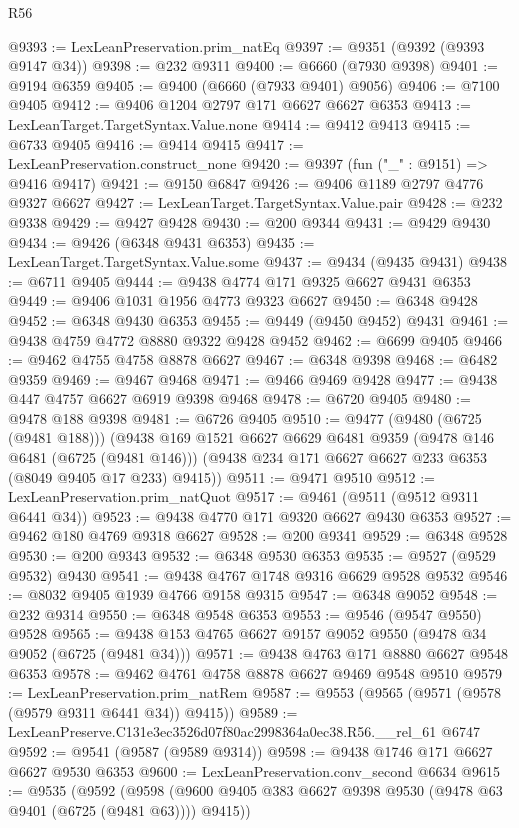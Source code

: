 \begin{lexlean}{R56}
\begin{coremodule}
@9393 := LexLeanPreservation.prim_natEq
@9397 := @9351 (@9392 (@9393 @9147 @34))
@9398 := @232 @9311
@9400 := @6660 (@7930 @9398)
@9401 := @9194 @6359
@9405 := @9400 (@6660 (@7933 @9401) @9056)
@9406 := @7100 @9405
@9412 := @9406 @1204 @2797 @171 @6627 @6627 @6353
@9413 := LexLeanTarget.TargetSyntax.Value.none
@9414 := @9412 @9413
@9415 := @6733 @9405
@9416 := @9414 @9415
@9417 := LexLeanPreservation.construct_none
@9420 := @9397 (fun ("_" : @9151) => @9416 @9417)
@9421 := @9150 @6847
@9426 := @9406 @1189 @2797 @4776 @9327 @6627
@9427 := LexLeanTarget.TargetSyntax.Value.pair
@9428 := @232 @9338
@9429 := @9427 @9428
@9430 := @200 @9344
@9431 := @9429 @9430
@9434 := @9426 (@6348 @9431 @6353)
@9435 := LexLeanTarget.TargetSyntax.Value.some
@9437 := @9434 (@9435 @9431)
@9438 := @6711 @9405
@9444 := @9438 @4774 @171 @9325 @6627 @9431 @6353
@9449 := @9406 @1031 @1956 @4773 @9323 @6627
@9450 := @6348 @9428
@9452 := @6348 @9430 @6353
@9455 := @9449 (@9450 @9452) @9431
@9461 := @9438 @4759 @4772 @8880 @9322 @9428 @9452
@9462 := @6699 @9405
@9466 := @9462 @4755 @4758 @8878 @6627
@9467 := @6348 @9398
@9468 := @6482 @9359
@9469 := @9467 @9468
@9471 := @9466 @9469 @9428
@9477 := @9438 @447 @4757 @6627 @6919 @9398 @9468
@9478 := @6720 @9405
@9480 := @9478 @188 @9398
@9481 := @6726 @9405
@9510 := @9477
    (@9480 (@6725 (@9481 @188)))
    (@9438
      @169
      @1521
      @6627
      @6629
      @6481
      @9359
      (@9478 @146 @6481 (@6725 (@9481 @146)))
      (@9438 @234 @171 @6627 @6627 @233 @6353 (@8049 @9405 @17 @233) @9415))
@9511 := @9471 @9510
@9512 := LexLeanPreservation.prim_natQuot
@9517 := @9461 (@9511 (@9512 @9311 @6441 @34))
@9523 := @9438 @4770 @171 @9320 @6627 @9430 @6353
@9527 := @9462 @180 @4769 @9318 @6627
@9528 := @200 @9341
@9529 := @6348 @9528
@9530 := @200 @9343
@9532 := @6348 @9530 @6353
@9535 := @9527 (@9529 @9532) @9430
@9541 := @9438 @4767 @1748 @9316 @6629 @9528 @9532
@9546 := @8032 @9405 @1939 @4766 @9158 @9315
@9547 := @6348 @9052
@9548 := @232 @9314
@9550 := @6348 @9548 @6353
@9553 := @9546 (@9547 @9550) @9528
@9565 := @9438 @153 @4765 @6627 @9157 @9052 @9550 (@9478 @34 @9052 (@6725 (@9481 @34)))
@9571 := @9438 @4763 @171 @8880 @6627 @9548 @6353
@9578 := @9462 @4761 @4758 @8878 @6627 @9469 @9548 @9510
@9579 := LexLeanPreservation.prim_natRem
@9587 := @9553 (@9565 (@9571 (@9578 (@9579 @9311 @6441 @34)) @9415))
@9589 := LexLeanPreserve.C131e3ec3526d07f80ac2998364a0ec38.R56.__rel_61 @6747
@9592 := @9541 (@9587 (@9589 @9314))
@9598 := @9438 @1746 @171 @6627 @6627 @9530 @6353
@9600 := LexLeanPreservation.conv_second @6634
@9615 := @9535
    (@9592 (@9598 (@9600 @9405 @383 @6627 @9398 @9530 (@9478 @63 @9401 (@6725 (@9481 @63)))) @9415))

\end{coremodule}
\end{lexlean}
